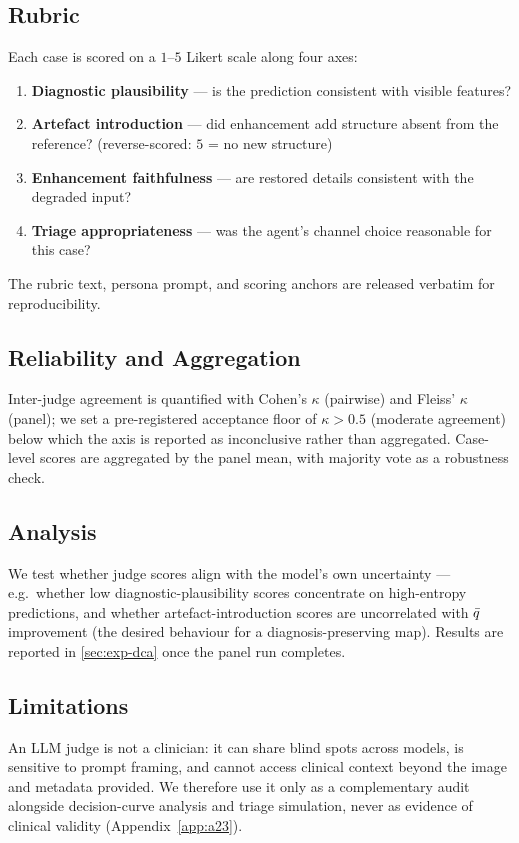 \subsection{Rubric}\label{app:a19-rubric}
Each case is scored on a $1$--$5$ Likert scale along four axes:
\begin{enumerate}
\item \textbf{Diagnostic plausibility} --- is the prediction consistent with visible features?
\item \textbf{Artefact introduction} --- did enhancement add structure absent from the reference?
(reverse-scored: $5$ = no new structure)
\item \textbf{Enhancement faithfulness} --- are restored details consistent with the degraded input?
\item \textbf{Triage appropriateness} --- was the agent's channel choice reasonable for this case?
\end{enumerate}
The rubric text, persona prompt, and scoring anchors are released verbatim for reproducibility.

\subsection{Reliability and Aggregation}\label{app:a19-reliability}
Inter-judge agreement is quantified with Cohen's $\kappa$ (pairwise) and Fleiss' $\kappa$ (panel);
we set a pre-registered acceptance floor of $\kappa>0.5$ (moderate agreement) below which the axis is
reported as inconclusive rather than aggregated. Case-level scores are aggregated by the panel mean,
with majority vote as a robustness check.

\subsection{Analysis}\label{app:a19-analysis}
We test whether judge scores align with the model's own uncertainty --- e.g.\ whether low
diagnostic-plausibility scores concentrate on high-entropy predictions, and whether
artefact-introduction scores are uncorrelated with $\bar{q}$ improvement (the desired behaviour for a
diagnosis-preserving map). Results are reported in \cref{sec:exp-dca} once the panel run completes.

\subsection{Limitations}\label{app:a19-limits}
An LLM judge is not a clinician: it can share blind spots across models, is sensitive to prompt
framing, and cannot access clinical context beyond the image and metadata provided. We therefore use
it only as a complementary audit alongside decision-curve analysis and triage simulation, never as
evidence of clinical validity (Appendix~\ref{app:a23}).
